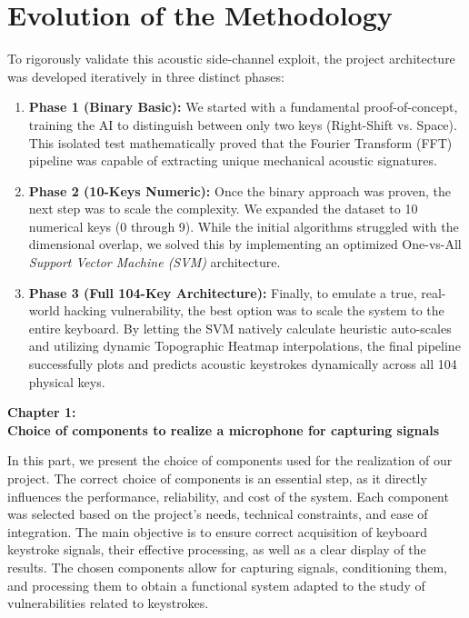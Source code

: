 \documentclass[12pt,a4paper]{article}
\begin{document}
\section*{Evolution of the Methodology}
To rigorously validate this acoustic side-channel exploit, the project architecture was developed iteratively in three distinct phases:
\begin{enumerate}
    \item \textbf{Phase 1 (Binary Basic):} We started with a fundamental proof-of-concept, training the AI to distinguish between only two keys (Right-Shift vs. Space). This isolated test mathematically proved that the Fourier Transform (FFT) pipeline was capable of extracting unique mechanical acoustic signatures.
    \item \textbf{Phase 2 (10-Keys Numeric):} Once the binary approach was proven, the next step was to scale the complexity. We expanded the dataset to 10 numerical keys (0 through 9). While the initial algorithms struggled with the dimensional overlap, we solved this by implementing an optimized One-vs-All \textit{Support Vector Machine (SVM)} architecture.
    \item \textbf{Phase 3 (Full 104-Key Architecture):} Finally, to emulate a true, real-world hacking vulnerability, the best option was to scale the system to the entire keyboard. By letting the SVM natively calculate heuristic auto-scales and utilizing dynamic Topographic Heatmap interpolations, the final pipeline successfully plots and predicts acoustic keystrokes dynamically across all 104 physical keys. 
\end{enumerate}

\newpage
\clearpage
\thispagestyle{empty}

\vspace*{\fill}
\begin{center}
    {\Huge\textbf{Chapter 1:}}\\[1em]
    {\Large\textbf{Choice of components to realize a microphone for capturing signals}}
\end{center}
\vspace*{\fill}

\clearpage
\setcounter{chapter}{1}

In this part, we present the choice of components used for the realization of our project. The correct choice of components is an essential step, as it directly influences the performance, reliability, and cost of the system. Each component was selected based on the project's needs, technical constraints, and ease of integration.
The main objective is to ensure correct acquisition of keyboard keystroke signals, their effective processing, as well as a clear display of the results. The chosen components allow for capturing signals, conditioning them, and processing them to obtain a functional system adapted to the study of vulnerabilities related to keystrokes.
\end{document}
